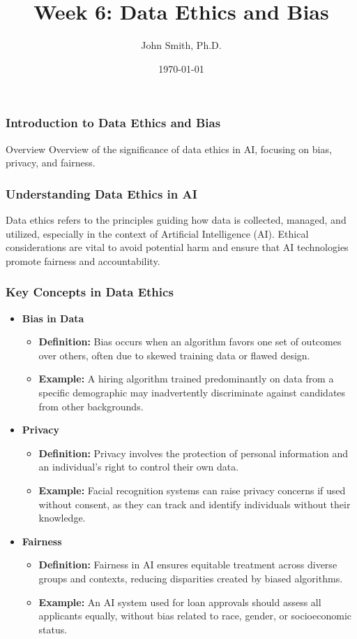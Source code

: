 \documentclass[aspectratio=169]{beamer}
\title[Week 6: Data Ethics and Bias]{Week 6: Data Ethics and Bias}
\author[J. Smith]{John Smith, Ph.D.}
\institute[University Name]{
  Department of Computer Science\\
  University Name\\
  \vspace{0.3cm}
  Email: email@university.edu\\
  Website: www.university.edu
}
\date{\today}
\begin{document}
\frame{\titlepage}

\begin{frame}[fragile]
    \frametitle{Introduction to Data Ethics and Bias}
    \begin{block}{Overview}
        Overview of the significance of data ethics in AI, focusing on bias, privacy, and fairness.
    \end{block}
\end{frame}

\begin{frame}[fragile]
    \frametitle{Understanding Data Ethics in AI}
    Data ethics refers to the principles guiding how data is collected, managed, and utilized, especially in the context of Artificial Intelligence (AI). Ethical considerations are vital to avoid potential harm and ensure that AI technologies promote fairness and accountability.
\end{frame}

\begin{frame}[fragile]
    \frametitle{Key Concepts in Data Ethics}
    \begin{itemize}
        \item \textbf{Bias in Data}
        \begin{itemize}
            \item \textbf{Definition:} Bias occurs when an algorithm favors one set of outcomes over others, often due to skewed training data or flawed design.
            \item \textbf{Example:} A hiring algorithm trained predominantly on data from a specific demographic may inadvertently discriminate against candidates from other backgrounds.
        \end{itemize}
        
        \item \textbf{Privacy}
        \begin{itemize}
            \item \textbf{Definition:} Privacy involves the protection of personal information and an individual's right to control their own data.
            \item \textbf{Example:} Facial recognition systems can raise privacy concerns if used without consent, as they can track and identify individuals without their knowledge.
        \end{itemize}
        
        \item \textbf{Fairness}
        \begin{itemize}
            \item \textbf{Definition:} Fairness in AI ensures equitable treatment across diverse groups and contexts, reducing disparities created by biased algorithms.
            \item \textbf{Example:} An AI system used for loan approvals should assess all applicants equally, without bias related to race, gender, or socioeconomic status.
        \end{itemize}
    \end{itemize}
\end{frame}
\end{document}
